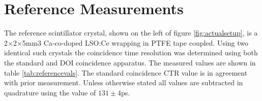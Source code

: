 \section{Reference Measurements}
The reference scintillator crystal, shown on the left of figure \ref{fig:actualsetup}, is a 2×2×5mm3 Ca-co-doped LSO:Ce wrapping in PTFE tape coupled. Using two identical such crystals the coincidence time resolution was determined using both the standard and DOI coincidence apparatus. The measured values are shown in table \ref{tab:referencevals}. The standard coincidence CTR value is in agreement with prior measurement\cite{arron_Meyer_Pauwels_Lecoq_2012}. Unless otherwise stated all values are subtracted in quadrature using the value of $131\pm4$ps.
